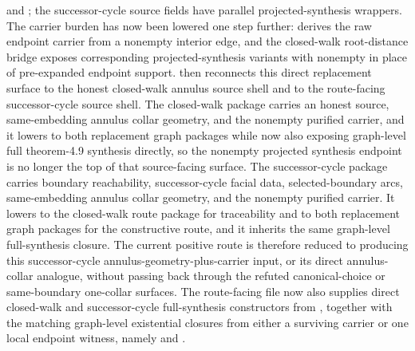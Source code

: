 \documentclass[11pt]{article}
\begin{document}
and
;
the successor-cycle source fields have parallel projected-synthesis wrappers.
The carrier burden has now been lowered one step further:
derives the raw endpoint carrier from a nonempty interior edge, and the
closed-walk root-distance bridge exposes corresponding projected-synthesis
variants with nonempty  in place of pre-expanded
endpoint support.
 then reconnects
this direct replacement surface to the honest closed-walk annulus source shell
and to the route-facing successor-cycle source shell.  The closed-walk package
 carries an
honest source, same-embedding annulus collar geometry, and the nonempty
purified carrier, and it lowers to both replacement graph packages while now
also exposing graph-level full theorem-4.9 synthesis directly, so the
nonempty projected synthesis endpoint is no longer the top of that source-facing
surface.  The successor-cycle package
 carries
boundary reachability, successor-cycle facial data, selected-boundary arcs,
same-embedding annulus collar geometry, and the nonempty purified carrier.  It
lowers to the closed-walk route package for traceability and to both
replacement graph packages for the constructive route, and it inherits the same
graph-level full-synthesis closure.  The current positive route is
therefore reduced to producing this successor-cycle
annulus-geometry-plus-carrier input, or its direct annulus-collar analogue,
without passing back through the refuted canonical-choice or same-boundary
one-collar surfaces.  The route-facing file now also supplies direct
closed-walk and successor-cycle full-synthesis constructors from
, together with the matching graph-level
existential closures from either a surviving carrier or one local endpoint
witness, namely
and
.
\end{document}

